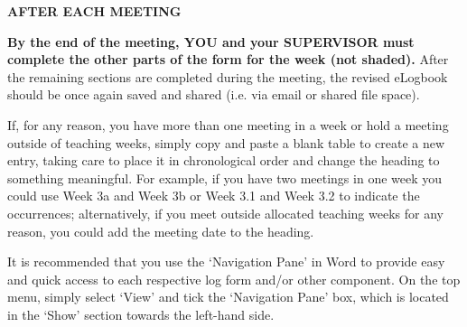 \documentclass[../CHEFCookingHelperForEveryonesFridge.tex]{subfiles}
\begin{document}
\textbf{AFTER EACH MEETING}

\textbf{By the end of the meeting, YOU and your SUPERVISOR must complete the other parts of the form for the week
(not shaded).} After the remaining sections are completed during the meeting, the revised eLogbook should be once
again saved and shared (i.e. via email or shared file space).

If, for any reason, you have more than one meeting in a week or hold a meeting outside of teaching weeks,
simply copy and paste a blank table to create a new entry, taking care to place it in chronological order and
change the heading to something meaningful. For example, if you have two meetings in one week you could use
Week 3a and Week 3b or Week 3.1 and Week 3.2 to indicate the occurrences; alternatively, if you meet outside
allocated teaching weeks for any reason, you could add the meeting date to the heading.

It is recommended that you use the \enquote*{Navigation Pane} in Word to provide easy and quick access to each respective
log form and/or other component.  On the top menu, simply select \enquote*{View} and tick the \enquote*{Navigation Pane} box, which
is located in the \enquote*{Show} section towards the left-hand side.



\end{document}
